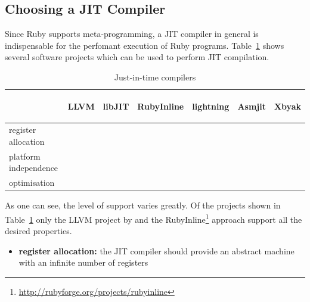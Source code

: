 \documentclass[12pt,a4paper,oneside,openright]{book}
\newcommand{\tbl}[1]{Table~\ref{tbl:#1}}
\newcommand{\tick}{\ding{52}} %
\newcommand{\xxxx}{}
\begin{document}
\begin{CJK}{UTF8}{}
\subsection{Choosing a \acs{JIT} Compiler}
Since Ruby supports meta-programming, a \ac{JIT} compiler in general is indispensable for the perfomant execution of Ruby programs. \tbl{jits} shows several software projects which can be used to perform \ac{JIT} compilation.
\begin{table}[t]
  \begin{center}
    \caption{Just-in-time compilers\label{tbl:jits}}\vspace{1em}
    \begin{tabular}{lcccccc}\toprule
      & \begin{sideways}LLVM\end{sideways} &
      \begin{sideways}libJIT\end{sideways} &
      \begin{sideways}RubyInline\end{sideways} &
      \begin{sideways}lightning\end{sideways} &
      \begin{sideways}Asmjit\end{sideways} &
      \begin{sideways}Xbyak\end{sideways}\\\midrule
      register allocation   & \tick & \tick & \tick & \xxxx & \xxxx & \xxxx\\
      platform independence & \tick & \tick & \tick & \tick & \xxxx & \xxxx\\
      optimisation          & \tick & \xxxx & \tick & \xxxx & \xxxx & \xxxx\\\bottomrule
    \end{tabular}
  \end{center}
\end{table}
As one can see, the level of support varies greatly. Of the projects shown in \tbl{jits} only the \ac{LLVM} project by \citet{RefWorks:566} and the RubyInline\footnote{\url{http://rubyforge.org/projects/rubyinline}} approach support all the desired properties.
\begin{itemize}
\item \textbf{register allocation:} the \ac{JIT} compiler should provide an abstract machine with an infinite number of registers

\end{itemize}
\end{CJK}
\end{document}
